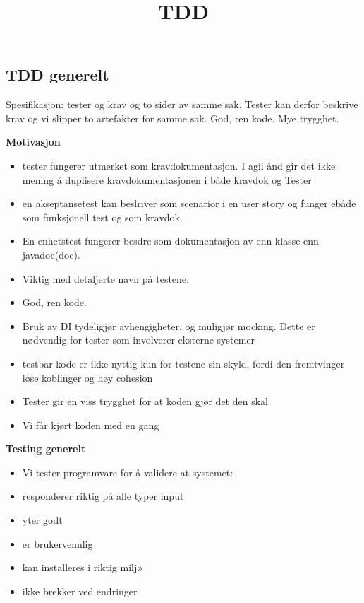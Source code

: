 \documentclass{article}
\title{TDD}
\begin{document}
    \begin{flushleft}

        \section{TDD generelt}
        Spesifikasjon: tester og krav og to sider av samme sak. Tester kan derfor beskrive krav og vi slipper to artefakter for samme sak. 
        God, ren kode. Mye trygghet. \par 
        \bigskip

        \textbf{Motivasjon}\par 
        \begin{itemize}
            \item tester fungerer utmerket som kravdokumentasjon. I agil ånd gir det ikke mening å duplisere kravdokumentasjonen i både kravdok og Tester
            \item en akseptansetest kan beslriver som scenarior i en user story og funger ebåde som funksjonell test og som kravdok. 
            \item En enhetstest fungerer besdre som dokumentasjon av enn klasse enn javadoc(doc).
            \item Viktig med detaljerte navn på testene.
            \item God, ren kode.  
            \item Bruk av DI tydeligjør avhengigheter, og muligjør mocking. Dette er nødvendig for tester som involverer eksterne systemer
            \item testbar kode er ikke nyttig kun for testene sin skyld, fordi den fremtvinger løse koblinger og høy cohesion
            \item Tester gir en viss trygghet for at koden gjør det den skal
            \item Vi får kjørt koden med en gang
        \end{itemize}

        \bigskip
        \textbf{Testing generelt}
        \begin{itemize}
            \item Vi tester programvare for å validere at systemet:
            \item responderer riktig på alle typer input
            \item yter godt
            \item er brukervennlig
            \item kan installeres i riktig miljø  
            \item ikke brekker ved endringer
        \end{itemize}
        

\end{flushleft}
\end{document}

